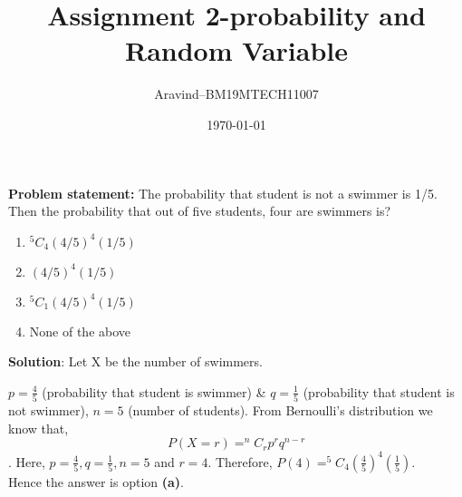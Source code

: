\documentclass[12pt,a4paper,twocolumn]{article}
\title{Assignment 2-probability and Random Variable}
\author{Aravind--BM19MTECH11007}
\date{\today}
\begin{document}
\maketitle


\textbf{Problem statement:} The probability that student is not a swimmer is 1/5. Then the probability that out of five students, four are swimmers is?
\begin{enumerate}[label=\alph*)]
    \item $^{5}C_4(4/5)^{4}(1/5)$
    \item $(4/5)^4(1/5)$
    \item $^{5}C_1(4/5)^4(1/5)$
    \item None of the above
\end{enumerate}

\textbf{Solution}: Let X be the number of swimmers.

$p=\frac{4}{5}$ (probability that student is swimmer) \&
$q=\frac{1}{5}$ (probability that student is not swimmer),
$n=5$ (number of students).
From Bernoulli's distribution we know that, 
$$P(X=r)=^{n}C_rp^{r}q^{n-r}$$.
Here, $p=\frac{4}{5},q=\frac{1}{5}, n=5$ and $r=4$. Therefore, $P(4)=^{5}C_4(\frac{4}{5})^{4}(\frac{1}{5})$.\\
Hence the answer is option \textbf{(a)}.
\end{document}
